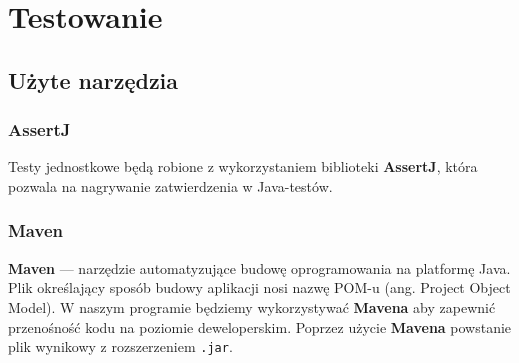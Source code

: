 \documentclass[a4paper, 12pt]{article}
\begin{document}
		

\newpage	
	\section{Testowanie}
		\subsection{Użyte narzędzia}
			\subsubsection{AssertJ}
				\hspace*{1cm} Testy jednostkowe będą robione z wykorzystaniem biblioteki \textbf{AssertJ}, która pozwala na nagrywanie zatwierdzenia w Java-testów.

			\subsubsection{Maven}
				\hspace*{1cm} \textbf{Maven} — narzędzie automatyzujące budowę oprogramowania na platformę Java. Plik określający sposób budowy aplikacji nosi nazwę POM-u (ang. Project Object Model). W naszym programie będziemy wykorzystywać \textbf{Mavena} aby zapewnić przenośność kodu na poziomie deweloperskim. Poprzez użycie \textbf{Mavena} powstanie plik wynikowy z rozszerzeniem \texttt{.jar}.
\label{LastPage}~
\label{LastPageOfBackMatter}~		
\end{document}
